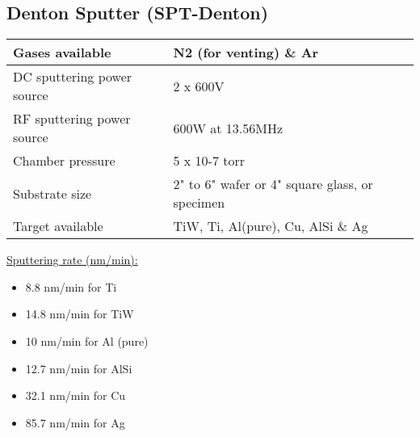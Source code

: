 \subsection{Denton Sputter (SPT-Denton)}\label{denton_sputter_machine}

	\begin{tabular}{|p{6cm}|p{8cm}|}
		\hline
		Gases available &
		N2 (for venting) \& Ar \\
		\hline
		DC sputtering power source &
		2 x 600V \\
		\hline
		RF sputtering power source &
		600W at 13.56MHz \\
		\hline
		Chamber pressure &
		5 x 10-7 torr \\
		\hline
		Substrate size &
		2" to 6" wafer or 4" square glass, or specimen \\
		\hline
		Target available &
		TiW, Ti, Al(pure), Cu, AlSi \& Ag \\
		\hline
	\end{tabular}

\begin{mdframed}
	\underline{Sputtering rate (nm/min):}
	
	\begin{itemize}
		\item 8.8 nm/min for Ti
		\item 14.8 nm/min for TiW
		\item 10 nm/min for Al (pure)
		\item 12.7 nm/min for AlSi
		\item 32.1 nm/min for Cu
		\item 85.7 nm/min for Ag	
	\end{itemize}
\end{mdframed}